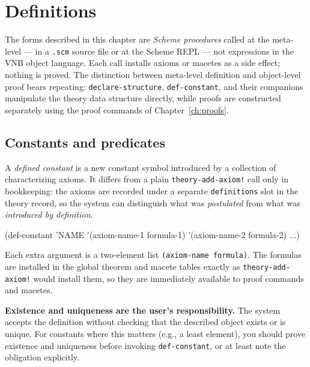 \chapter{Definitions}

The forms described in this chapter are \emph{Scheme procedures} called
at the meta-level --- in a \texttt{.scm} source file or at the Scheme
REPL --- not expressions in the VNB object language.  Each call installs
axioms or macetes as a side effect; nothing is
proved.  The distinction between meta-level definition and object-level
proof bears repeating: \texttt{declare-structure}, \texttt{def-constant},
and their companions manipulate the theory data structure directly, while
proofs are constructed separately using the proof commands of
Chapter~\ref{ch:proofs}.

\section{Constants and predicates}
\label{sec:def-constant}

A \emph{defined constant} is a new constant symbol introduced by a
collection of characterizing axioms.  It differs from a plain
\texttt{theory-add-axiom!} call only in bookkeeping: the axioms are
recorded under a separate \texttt{definitions} slot in the theory record,
so the system can distinguish what was \emph{postulated} from what was
\emph{introduced by definition}.

\begin{VNBcode}
(def-constant 'NAME
  '(axiom-name-1 formula-1)
  '(axiom-name-2 formula-2)
  ...)
\end{VNBcode}

\begin{sloppypar}Each extra argument is a two-element list \texttt{(axiom-name formula)}.
The formulas are installed in the global theorem and macete tables exactly
as \texttt{theory-add-axiom!} would install them, so they are immediately
available to proof commands and macetes.\end{sloppypar}

\textbf{Existence and uniqueness are the user's responsibility.}  The
system accepts the definition without checking that the described object
exists or is unique.  For constants where this matters (e.g., a least
element), you should prove existence and uniqueness before invoking
\texttt{def-constant}, or at least note the obligation explicitly.

